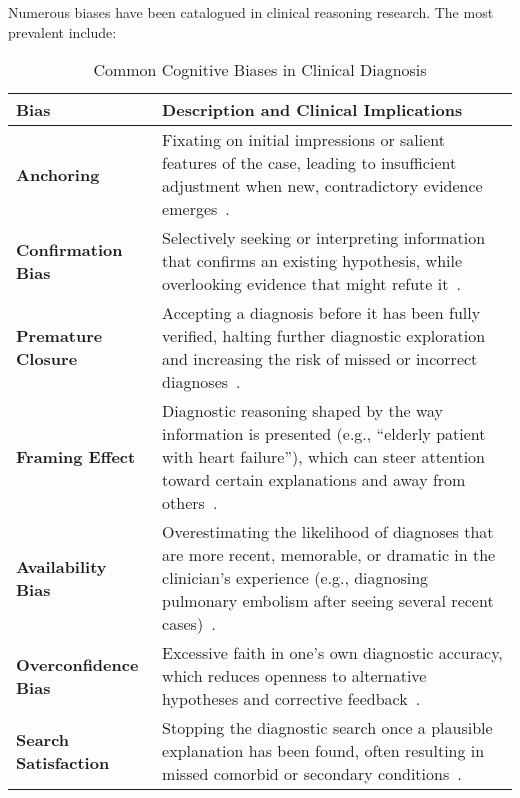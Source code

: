Numerous biases have been catalogued in clinical reasoning research. The most prevalent include:

\begin{table}[h]
\centering
\caption{Common Cognitive Biases in Clinical Diagnosis}
\label{tab:bias-taxonomy}
\begin{tabular}{p{3cm} p{10cm}}
\toprule
\textbf{Bias} & \textbf{Description and Clinical Implications} \\
\midrule
\textbf{Anchoring} & Fixating on initial impressions or salient features of the case, leading to insufficient adjustment when new, contradictory evidence emerges~\parencite{croskerry_importance_2003,mull_cognitive_2015}. \\
\textbf{Confirmation Bias} & Selectively seeking or interpreting information that confirms an existing hypothesis, while overlooking evidence that might refute it~\parencite{berge_cognitive_2013,mull_cognitive_2015}. \\
\textbf{Premature Closure} & Accepting a diagnosis before it has been fully verified, halting further diagnostic exploration and increasing the risk of missed or incorrect diagnoses~\parencite{graber_diagnostic_2005,mull_cognitive_2015}. \\
\textbf{Framing Effect} & Diagnostic reasoning shaped by the way information is presented (e.g., “elderly patient with heart failure”), which can steer attention toward certain explanations and away from others~\parencite{croskerry_importance_2003,mull_cognitive_2015}. \\
\textbf{Availability Bias} & Overestimating the likelihood of diagnoses that are more recent, memorable, or dramatic in the clinician’s experience (e.g., diagnosing pulmonary embolism after seeing several recent cases)~\parencite{graber_diagnostic_2005,croskerry_importance_2003}. \\
\textbf{Overconfidence Bias} & Excessive faith in one’s own diagnostic accuracy, which reduces openness to alternative hypotheses and corrective feedback~\parencite{mamede_structure_2004,berner_overconfidence_2008}. \\
\textbf{Search Satisfaction} & Stopping the diagnostic search once a plausible explanation has been found, often resulting in missed comorbid or secondary conditions~\parencite{croskerry_importance_2003,graber_diagnostic_2005}. \\
\bottomrule
\end{tabular}
\end{table}


